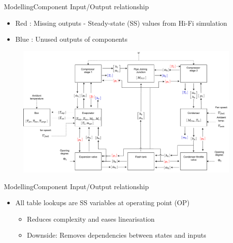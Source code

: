 
\begin{frame}{Modelling}{Component Input/Output relationship}
	\begin{itemize}
		\item \color{red} Red \color{black}: Missing outputs - Steady-state (SS) values from Hi-Fi simulation
		\item \color{blue} Blue \color{black}: Unused outputs of components
	\end{itemize}
	\begin{figure}[h!]
		\centering
		\includegraphics[width=1.04\textwidth]{../Graphics/Block_Diagram_inout_flowValveVersion.pdf}
		\label{fig:Block_diagram_inout}
	\end{figure}
	
\end{frame}


\begin{frame}{Modelling}{Component Input/Output relationship}
	\begin{itemize}
		\item All table lookups are SS variables at operating point (OP)
			\begin{itemize}
				\item Reduces complexity and eases linearisation
				\item Downside: Removes dependencies between states and inputs
			\end{itemize}
	\end{itemize}
\end{frame}





